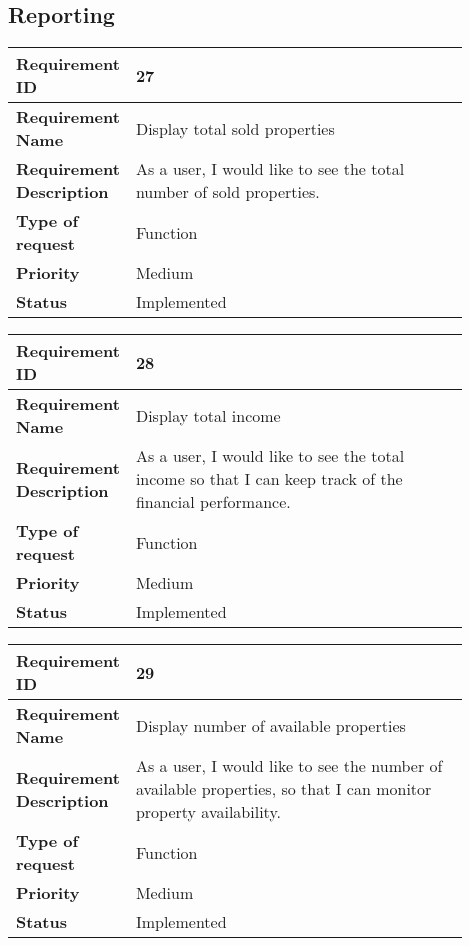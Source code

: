 \newpage
\subsection{Reporting}
\begin{table}[htbp]
\centering
\begin{tabular}{|m{0.15\linewidth}|m{0.75\linewidth}|}
\hline
\textbf{Requirement ID} & 27 \\
\hline
\textbf{Requirement Name} & Display total sold properties \\
\hline
\textbf{Requirement Description} & As a user, I would like to see the total number of sold properties. \\
\hline
\textbf{Type of request} & Function \\
\hline
\textbf{Priority} & Medium \\
\hline
\textbf{Status} & Implemented \\
\hline
\end{tabular}
\end{table}

\begin{table}[htbp]
\centering
\begin{tabular}{|m{0.15\linewidth}|m{0.75\linewidth}|}
\hline
\textbf{Requirement ID} & 28 \\
\hline
\textbf{Requirement Name} & Display total income \\
\hline
\textbf{Requirement Description} & As a user, I would like to see the total income so that I can keep track of the financial performance. \\
\hline
\textbf{Type of request} & Function \\
\hline
\textbf{Priority} & Medium \\
\hline
\textbf{Status} & Implemented \\
\hline
\end{tabular}
\end{table}

\begin{table}[htbp]
\centering
\begin{tabular}{|m{0.15\linewidth}|m{0.75\linewidth}|}
\hline
\textbf{Requirement ID} & 29 \\
\hline
\textbf{Requirement Name} & Display number of available properties \\
\hline
\textbf{Requirement Description} & As a user, I would like to see the number of available properties, so that I can monitor property availability. \\
\hline
\textbf{Type of request} & Function \\
\hline
\textbf{Priority} & Medium \\
\hline
\textbf{Status} & Implemented \\
\hline
\end{tabular}
\end{table}

